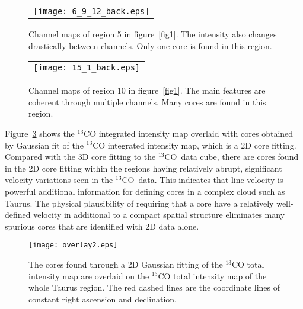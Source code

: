 \documentclass[12pt,preprint]{aastex}
\def\13co{$^{13}$CO}
\begin{document}
\begin{figure}[htb]
\begin{tabular}{c}
\texttt{[image: 6\_9\_12\_back.eps]}\\
\end{tabular}
\caption{Channel maps of region 5 in figure~\ref{fig1}. The intensity also changes drastically between channels. Only one core is found in this region.  \label{channel3}}
\end{figure}

\begin{figure}[htb]
\begin{tabular}{c}
\texttt{[image: 15\_1\_back.eps]}\\
\end{tabular}
\caption{Channel maps of region 10 in figure~\ref{fig1}. The main features are coherent through multiple channels.
Many cores are found in this region. \label{channel2}}
\end{figure}

Figure~\ref{overlay2} shows the $^{13}$CO integrated intensity map overlaid with cores obtained by Gaussian fit of the $^{13}$CO integrated intensity map,
which is a 2D core fitting. Compared with the 3D core fitting to the \13co\ data cube, there are cores found in the 2D core fitting
within the regions having relatively abrupt, significant velocity variations seen in the \13co\ data.
This indicates that line velocity is powerful additional information for defining cores in a complex cloud
such as Taurus. The physical plausibility of requiring that a core have a relatively well-defined velocity
in additional to a compact spatial structure eliminates many spurious cores that are
identified with 2D data alone.
\begin{figure}[htb]
\centering
\texttt{[image: overlay2.eps]}
\caption{ The cores found through a 2D Gaussian fitting of the \13co total intensity map are overlaid on the $^{13}$CO total intensity map of the whole Taurus region. The red dashed lines are the coordinate lines of constant right ascension and declination.\label{overlay2}}
\end{figure}
\end{document}
